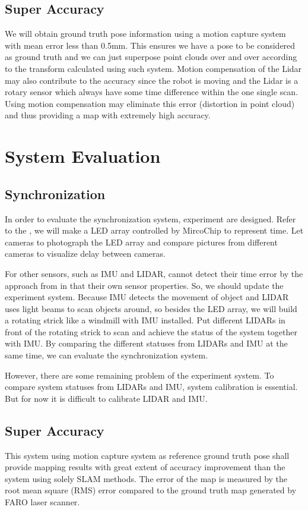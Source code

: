 \documentclass[conference]{IEEEtran}
\begin{document}
\subsection{Super Accuracy}
    We will obtain ground truth pose information using a motion capture system with mean error less than 0.5mm. This ensures we have a pose to be considered as ground truth and we can just superpose point clouds over and over according to the transform calculated using such system. Motion compensation of the Lidar may also contribute to the accuracy since the robot is moving and the Lidar is a rotary sensor which always have some time difference within the one single scan. Using motion compensation may eliminate this error (distortion in point cloud) and thus providing a map with extremely high accuracy.
   
\section{System Evaluation}
\subsection{Synchronization}
	In order to evaluate the synchronization system, experiment are designed. Refer to the \cite{Litos2006Synchronous}, we will make a LED array controlled by MircoChip to represent time. Let cameras to photograph the LED array and compare pictures from different cameras to visualize delay between cameras.
	\par
	For other sensors, such as IMU and LIDAR, cannot detect their time error by the approach from \cite{Litos2006Synchronous} in that their own sensor properties. So, we should update the experiment system. Because IMU detects the movement of object and LIDAR uses light beams to scan objects around, so besides the LED array, we will build a rotating strick like a windmill with IMU installed. Put different LIDARs in front of the rotating strick to scan and achieve the  status of the system together with IMU. By comparing the different statuses from LIDARs and IMU at the same time, we can evaluate the synchronization system.
	\par
	However, there are some remaining problem of the experiment system. To compare system statuses from LIDARs and IMU, system calibration is essential. But for now it is difficult to calibrate LIDAR and IMU.
	
\subsection{Super Accuracy}
    This system using motion capture system as reference ground truth pose shall provide mapping results with great extent of accuracy improvement than the system using solely SLAM methods. The error of the map is measured by the root mean square (RMS) error compared to the ground truth map generated by FARO laser scanner.
\end{document}
